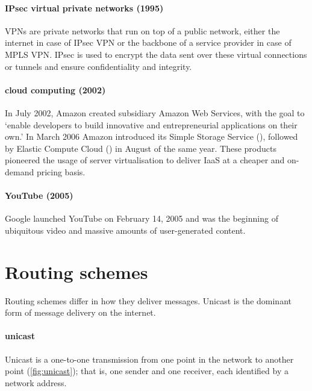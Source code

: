 \paragraph{IPsec virtual private networks (1995)}%
\Glspl{VPN} are private networks that run on top of a public network, either the internet in case of IPsec \gls{VPN} or the backbone of a service provider in case of \acs{MPLS} \gls{VPN}.
IPsec is used to encrypt the data sent over these virtual connections or tunnels and ensure confidentiality and integrity.


\paragraph{cloud computing (2002)}%
In July 2002, Amazon created subsidiary Amazon Web Services, with the goal to `enable developers to build innovative and entrepreneurial applications on their own.'
In March 2006 Amazon introduced its Simple Storage Service (), followed by Elastic Compute Cloud () in August of the same year.
These products pioneered the usage of server virtualisation to deliver IaaS at a cheaper and on-demand pricing basis.

\paragraph{YouTube (2005)}
Google launched YouTube on February 14, 2005 and was the beginning of ubiquitous video and massive amounts of user-generated content.




\section{Routing schemes}
\label{sec:ip-routing-schemes}
Routing schemes differ in how they deliver messages.
Unicast is the dominant form of message delivery on the internet.

\paragraph{unicast}
Unicast is a one-to-one transmission from one point in the network to another point (\cref{fig:unicast}); that is, one sender and one receiver, each identified by a network address.


